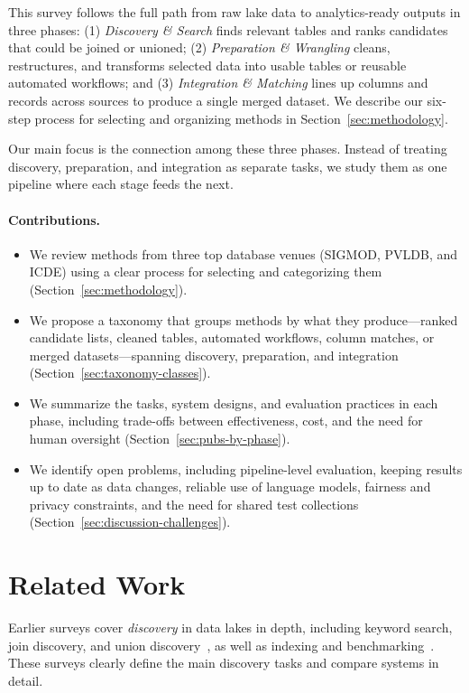 \documentclass[sigconf]{acmart}
\begin{document}
This survey follows the full path from raw lake data to analytics-ready outputs in three phases:
(1) \emph{Discovery \& Search} finds relevant tables and ranks candidates that could be joined or unioned;
(2) \emph{Preparation \& Wrangling} cleans, restructures, and transforms selected data into usable tables or reusable automated workflows; and
(3) \emph{Integration \& Matching} lines up columns and records across sources to produce a single merged dataset.
We describe our six-step process for selecting and organizing methods in Section~\ref{sec:methodology}.

Our main focus is the connection among these three phases. Instead of treating discovery, preparation, and integration as separate tasks, we study them as one pipeline where each stage feeds the next.

\paragraph{Contributions.}
\begin{itemize}
  \item We review methods from three top database venues (SIGMOD, PVLDB, and ICDE) using a clear process for selecting and categorizing them (Section~\ref{sec:methodology}).
  \item We propose a taxonomy that groups methods by what they produce---ranked candidate lists, cleaned tables, automated workflows, column matches, or merged datasets---spanning discovery, preparation, and integration (Section~\ref{sec:taxonomy-classes}).
  \item We summarize the tasks, system designs, and evaluation practices in each phase, including trade-offs between effectiveness, cost, and the need for human oversight (Section~\ref{sec:pubs-by-phase}).
  \item We identify open problems, including pipeline-level evaluation, keeping results up to date as data changes, reliable use of language models, fairness and privacy constraints, and the need for shared test collections (Section~\ref{sec:discussion-challenges}).
\end{itemize}


\section{Related Work}
\label{sec:related}
Earlier surveys cover \emph{discovery} in data lakes in depth, including keyword search, join discovery, and union discovery~\cite{10.1145/3555041.3589409}, as well as indexing and benchmarking~\cite{10.14778/3750601.3750694}. These surveys clearly define the main discovery tasks and compare systems in detail.
\end{document}
